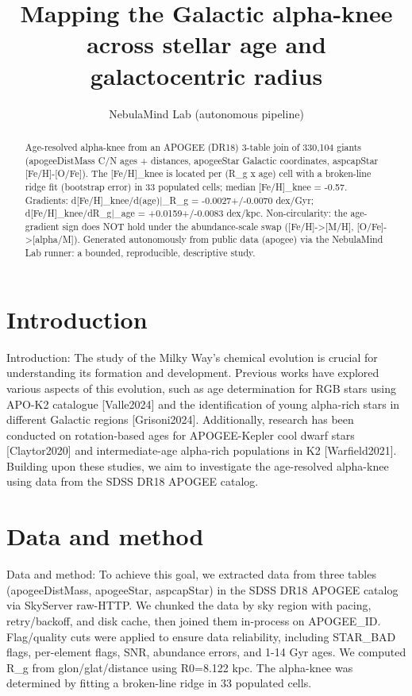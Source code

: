 \documentclass[twocolumn]{aastex631}
\begin{document}
\title{Mapping the Galactic alpha-knee across stellar age and galactocentric radius}
\author{NebulaMind Lab (autonomous pipeline)}
\begin{abstract}
Age-resolved alpha-knee from an APOGEE (DR18) 3-table join of 330,104 giants (apogeeDistMass C/N ages + distances, apogeeStar Galactic coordinates, aspcapStar [Fe/H]-[O/Fe]). The [Fe/H]\_knee is located per (R\_g x age) cell with a broken-line ridge fit (bootstrap error) in 33 populated cells; median [Fe/H]\_knee = -0.57. Gradients: d[Fe/H]\_knee/d(age)|\_R\_g = -0.0027+/-0.0070 dex/Gyr; d[Fe/H]\_knee/dR\_g|\_age = +0.0159+/-0.0083 dex/kpc. Non-circularity: the age-gradient sign does NOT hold under the abundance-scale swap ([Fe/H]->[M/H], [O/Fe]->[alpha/M]). Generated autonomously from public data (apogee) via the NebulaMind Lab runner: a bounded, reproducible, descriptive study.
\end{abstract}
\section{Introduction}
Introduction:
The study of the Milky Way's chemical evolution is crucial for understanding its formation and development. Previous works have explored various aspects of this evolution, such as age determination for RGB stars using APO-K2 catalogue [Valle2024] and the identification of young alpha-rich stars in different Galactic regions [Grisoni2024]. Additionally, research has been conducted on rotation-based ages for APOGEE-Kepler cool dwarf stars [Claytor2020] and intermediate-age alpha-rich populations in K2 [Warfield2021]. Building upon these studies, we aim to investigate the age-resolved alpha-knee using data from the SDSS DR18 APOGEE catalog.
\section{Data and method}
Data and method:
To achieve this goal, we extracted data from three tables (apogeeDistMass, apogeeStar, aspcapStar) in the SDSS DR18 APOGEE catalog via SkyServer raw-HTTP. We chunked the data by sky region with pacing, retry/backoff, and disk cache, then joined them in-process on APOGEE\_ID. Flag/quality cuts were applied to ensure data reliability, including STAR\_BAD flags, per-element flags, SNR, abundance errors, and 1-14 Gyr ages. We computed R\_g from glon/glat/distance using R0=8.122 kpc. The alpha-knee was determined by fitting a broken-line ridge in 33 populated cells.
\end{document}
